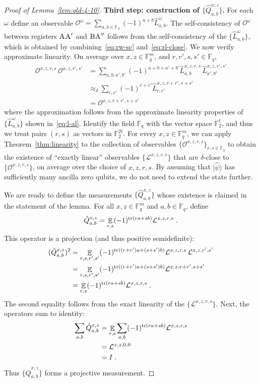 \documentclass[11pt]{article}
\theoremstyle{definition}
\newcommand{\ket}[1]{|#1\rangle}
\newcommand{\Id}{\ensuremath{I}}
\newcommand{\F}{\ensuremath{\mathbb{F}}}
\DeclareMathOperator{\tr}{tr}
\newcommand{\E}{\mathop{\mathbb{E}}\displaylimits}
\newcommand{\labelstyle}[1]{\ensuremath{\textsc{#1}}\xspace}
\newcommand{\alice}{\labelstyle{A}}
\newcommand{\bob}{\labelstyle{B}}
\begin{document}
\begin{proof}[Proof of Lemma~\ref{lem:qld-4-10}]
	\textbf{Third step: construction of $\{ \hat{Q}^{x,z}_{a,b} \}$.}
	For each $\omega$ define an observable $\mathcal{O}^\omega = \sum_{a,b \in \F_2} (-1)^{a+ b} \hat{L}^\omega_{a,b}$.  The self-consistency of $\mathcal{O}^\omega$ between registers $\alice \alice'$ and $\bob \alice''$ follows from the self-consistency of the $\{ \hat{L}^\omega_{a,b} \}$, which is obtained by combining~\eqref{eq:rw-sc} and~\eqref{eq:rl-close}. We now verify approximate linearity. On average over $x,z \in \F_q^m$, and $r,r',s,s' \in \F_q$, 
	\begin{align*}
		\mathcal{O}^{x,z,r,s} \, \mathcal{O}^{x,z,r',s'} &= \sum_{a,b,a',b'} (-1)^{a + b + a' + b'} \hat{L}^{x,z,r,s}_{a,b} \, \hat{L}^{x,z,r',s'}_{a',b'} \\
		&\approx_\delta \sum_{c,c'} (-1)^{c+c'} \hat{L}^{x,z,r+r',s+s'}_{c,c'} \\
		&= \mathcal{O}^{x,z,r+r',s+s'}\,
	\end{align*}
	where the approximation follows from the approximate linearity properties of $\{ \hat{L}^\omega_{a,b} \}$ shown in~\eqref{eq:l-al}.
	Identify the field $\F_q$ with the vector space $\F_2^t$, and thus we treat pairs $(r,s)$ as vectors in $\F_2^{2t}$. For every $x,z \in \F_q^m$, we can apply Theorem~\ref{thm:linearity} to the collection of observables $\{ \mathcal{O}^{x,z,r,s} \}_{r,s \in \F_q}$ to obtain the existence of ``{exactly linear}'' observables $\{ \mathcal{L}^{x,z,r,s} \}$ that are $\delta$-close to $\{ \mathcal{O}^{x,z,r,s} \}$, on average over the choice of $x,z,r,s$. By assuming that $\ket{\hat{\psi}}$ has sufficiently many ancilla zero qubits, we do not need to extend the state further. 
	
	We are ready to define the measurements $\{\hat{Q}^{x,z}_{a,b} \}$ whose existence is claimed in the statement of the lemma. For all $x,z\in \F_q^m$ and $a,b \in \F_q$, define
	\[
		\hat{Q}^{x,z}_{a,b} = \E_{r,s} (-1)^{\tr(ra + sb)} \mathcal{L}^{x,z,r,s}\;.
	\]
	This operator is a projection (and thus positive semidefinite):
	\begin{align*}
	(\hat{Q}^{x,z}_{a,b})^2 &= \E_{r,s,r',s'} (-1)^{\tr((r+r')a + (s+s')b)} \mathcal{L}^{x,z,r,s} \, \mathcal{L}^{x,z,r',s'}\\ 
	&= \E_{r,s,r',s'} (-1)^{\tr((r+r')a + (s+s')b)} \mathcal{L}^{x,z,r+r',s+s'} \\
	&= \E_{r,s} (-1)^{\tr(ra + sb)}  \mathcal{L}^{x,z,r,s}\;.
	\end{align*}
	The second equality follows from the exact linearity of the $\{ \mathcal{L}^{x,z,r,s} \}$. Next, the operators sum to identity:
	\begin{align*}
		\sum_{a,b} \hat{Q}^{x,z}_{a,b} &= \E_{r,s} \sum_{a,b} (-1)^{\tr(ra + sb)} \mathcal{L}^{x,z,r,s} \\
		&= \mathcal{L}^{x,z,0,0} \\
		&= \Id\;.
	\end{align*}
	Thus $\{\hat{Q}^{x,z}_{a,b}\}$ forms a projective measurement.
	

\end{proof}
\end{document}
